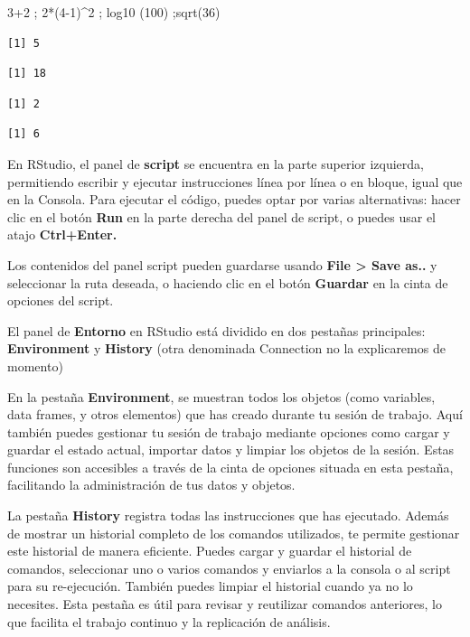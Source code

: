 \documentclass[
  letterpaper,
  DIV=11,
  numbers=noendperiod]{scrartcl}
\newenvironment{Shaded}{\begin{snugshade}}{\end{snugshade}}
\newcommand{\DecValTok}[1]{\textcolor[rgb]{0.68,0.00,0.00}{#1}}
\newcommand{\FunctionTok}[1]{\textcolor[rgb]{0.28,0.35,0.67}{#1}}
\newcommand{\NormalTok}[1]{\textcolor[rgb]{0.00,0.23,0.31}{#1}}
\newcommand{\SpecialCharTok}[1]{\textcolor[rgb]{0.37,0.37,0.37}{#1}}
\begin{document}
\begin{Shaded}
\begin{Highlighting}[]
\DecValTok{3}\SpecialCharTok{+}\DecValTok{2}\NormalTok{ ; }\DecValTok{2}\SpecialCharTok{*}\NormalTok{(}\DecValTok{4{-}1}\NormalTok{)}\SpecialCharTok{\^{}}\DecValTok{2}\NormalTok{ ; }\FunctionTok{log10}\NormalTok{ (}\DecValTok{100}\NormalTok{) ;}\FunctionTok{sqrt}\NormalTok{(}\DecValTok{36}\NormalTok{)}
\end{Highlighting}
\end{Shaded}

\begin{verbatim}
[1] 5
\end{verbatim}

\begin{verbatim}
[1] 18
\end{verbatim}

\begin{verbatim}
[1] 2
\end{verbatim}

\begin{verbatim}
[1] 6
\end{verbatim}

En RStudio, el panel de \textbf{script} se encuentra en la parte
superior izquierda, permitiendo escribir y ejecutar instrucciones línea
por línea o en bloque, igual que en la Consola. Para ejecutar el código,
puedes optar por varias alternativas: hacer clic en el botón
\textbf{Run} en la parte derecha del panel de script, o puedes usar el
atajo \textbf{Ctrl+Enter.}

Los contenidos del panel script pueden guardarse usando \textbf{File
\textgreater{} Save as..} y seleccionar la ruta deseada, o haciendo clic
en el botón \textbf{Guardar} en la cinta de opciones del script.

El panel de \textbf{Entorno} en RStudio está dividido en dos pestañas
principales: \textbf{Environment} y \textbf{History} (otra denominada
Connection no la explicaremos de momento)

En la pestaña \textbf{Environment}, se muestran todos los objetos (como
variables, data frames, y otros elementos) que has creado durante tu
sesión de trabajo. Aquí también puedes gestionar tu sesión de trabajo
mediante opciones como cargar y guardar el estado actual, importar datos
y limpiar los objetos de la sesión. Estas funciones son accesibles a
través de la cinta de opciones situada en esta pestaña, facilitando la
administración de tus datos y objetos.

La pestaña \textbf{History} registra todas las instrucciones que has
ejecutado. Además de mostrar un historial completo de los comandos
utilizados, te permite gestionar este historial de manera eficiente.
Puedes cargar y guardar el historial de comandos, seleccionar uno o
varios comandos y enviarlos a la consola o al script para su
re-ejecución. También puedes limpiar el historial cuando ya no lo
necesites. Esta pestaña es útil para revisar y reutilizar comandos
anteriores, lo que facilita el trabajo continuo y la replicación de
análisis.
\end{document}
